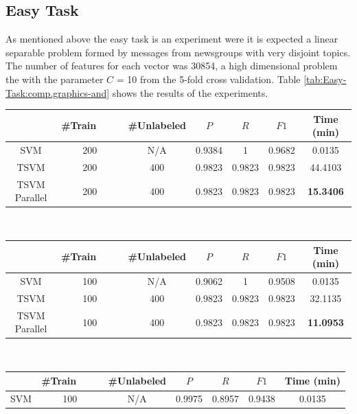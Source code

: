 \subsection{Easy Task}

As mentioned above the easy task is an experiment were it is expected
a linear separable problem formed by messages from newsgroups with
very disjoint topics. The number of features for each vector was 30854,
a high dimensional problem the with the parameter $C$ = 10 from the
5-fold cross validation. Table \ref{tab:Easy-Task:comp.graphics-and}
shows the results of the experiments. 

%
\begin{table}
\begin{longtable}
\begin{tabular}{|c|c|c|c|c|c||c|}
\hline
 & \#Train\ \ \ \ & \#Unlabeled & $P$  & $R$  & $F1$  & Time (min)\tabularnewline
\hline 
SVM & 200 & N/A & 0.9384 & 1 & 0.9682 & 0.0135\tabularnewline
\hline 
TSVM & 200 & 400 & 0.9823 & 0.9823 & 0.9823 & 44.4103\tabularnewline
\hline 
TSVM Parallel & 200 & 400 & 0.9823 & 0.9823 & 0.9823 & \textbf{15.3406}\tabularnewline
\hline
\end{tabular}\\
\tabularnewline
\tabularnewline
\begin{tabular}{|c|c|c|c|c|c||c|}
\hline 
 & \#Train\ \ \ \ & \#Unlabeled & $P$  & $R$  & $F1$  & Time (min)\tabularnewline
\hline 
SVM & 100 & N/A & 0.9062 & 1 & 0.9508 & 0.0135\tabularnewline
\hline 
TSVM & 100 & 400 & 0.9823 & 0.9823 & 0.9823 & 32.1135\tabularnewline
\hline 
TSVM Parallel & 100 & 400 & 0.9823 & 0.9823 & 0.9823 & \textbf{11.0953}\tabularnewline
\hline
\end{tabular} \\
\tabularnewline
\tabularnewline
\begin{tabular}{|c|c|c|c|c|c||c|}
\hline 
 & \#Train\ \ \ \ & \#Unlabeled & $P$  & $R$  & $F1$  & Time (min)\tabularnewline
\hline
\hline 
SVM & 100 & N/A & 0.9975 & 0.8957 & 0.9438 & 0.0135\tabularnewline

\end{tabular}
\end{longtable}
\end{table}
